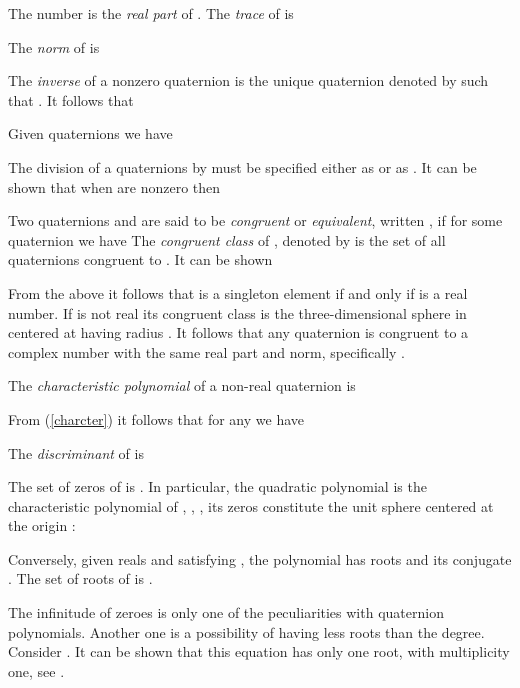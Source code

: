 \documentclass{article}
\theoremstyle{definition}
\begin{document}
The number  is the {\it real part} of . The {\it trace} of  is

The {\it norm} of  is

The {\it inverse} of a nonzero quaternion   is the unique quaternion denoted by  such that .
It follows that

Given quaternions  we have

The division of a quaternions  by  must be specified either as   or as .
It can be shown that when   are nonzero then


Two quaternions  and  are said to be {\it congruent} or {\it
equivalent}, written , if for some  quaternion  we have  The {\it congruent class} of , denoted by  is the set of all
quaternions congruent to . It can be shown


From the above it follows that   is a singleton element if and
only if  is a real number. If  is not real its congruent class
is the three-dimensional sphere in  centered at
 having radius . It
follows that any quaternion is congruent to a complex number with
the same real part and norm, specifically .

The {\it characteristic polynomial} of a non-real quaternion  is


From (\ref{charcter}) it follows that for any  we have


The {\it discriminant} of  is

The set of zeros of  is . In particular, the quadratic
polynomial  is the characteristic polynomial of , , , its zeros constitute the unit
sphere centered at the origin :


Conversely, given reals  and  satisfying , the polynomial  has roots
 and its conjugate
. The set of roots of  is .

The infinitude of zeroes is only one of the peculiarities with quaternion polynomials. Another one is a possibility of having less roots than the degree.
Consider . It can be shown that
this equation has only one root,  with multiplicity  one,
see \cite{kalQ}.
\end{document}
